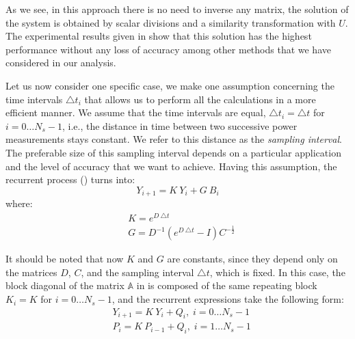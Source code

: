 As we see, in this approach there is no need to inverse any matrix, the solution of the system is obtained by scalar divisions and a similarity transformation with $U$. The experimental results given in  show that this solution has the highest performance without any loss of accuracy among other methods that we have considered in our analysis.

Let us now consider one specific case, we make one assumption concerning the time intervals $\triangle t_i$ that allows us to perform all the calculations in a more efficient manner. We assume that the time intervals are equal, $\triangle t_i = \triangle t$ for $i = 0 \dots N_s - 1$, i.e., the distance in time between two successive power measurements stays constant. We refer to this distance as the \emph{sampling interval}. The preferable size of this sampling interval depends on a particular application and the level of accuracy that we want to achieve. Having this assumption, the recurrent process () turns into:
\[
  Y_{i+1} = K \: Y_i + G \: B_i
\]
where:
\begin{align*}
  & K = e^{D \: \triangle t} \\
  & G = D^{-1} \left( e^{D \: \triangle t} - I \right) C^{-\frac{1}{2}}
\end{align*}

It should be noted that now $K$ and $G$ are constants, since they depend only on the matrices $D$, $C$, and the sampling interval $\triangle t$, which is fixed. In this case, the block diagonal of the matrix $\mathbb{A}$ in  is composed of the same repeating block $K_i = K$ for $i = 0 \dots N_s - 1$, and the recurrent expressions take the following form:
\begin{align}
  & Y_{i + 1} = K \: Y_i + Q_i, \; i = 0 \dots N_s - 1 \nonumber \\
  & P_i = K \: P_{i - 1} + Q_i, \; i = 1 \dots N_s - 1 \nonumber
\end{align}
